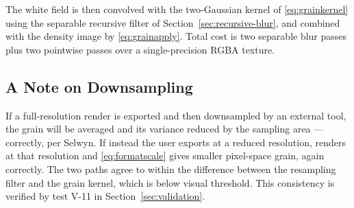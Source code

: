 The white field is then convolved with the two-Gaussian kernel of
\eqref{eq:grainkernel} using the separable recursive filter of
Section~\ref{sec:recursive-blur}, and combined with the density image by
\eqref{eq:grainapply}. Total cost is two separable blur passes plus two
pointwise passes over a single-precision RGBA texture.

\subsection{A Note on Downsampling}

If a full-resolution render is exported and then downsampled by an external
tool, the grain will be averaged and its variance reduced by the sampling
area --- correctly, per Selwyn. If instead the user exports at a reduced
resolution, \EM{} renders at that resolution and \eqref{eq:formatscale} gives
smaller pixel-space grain, again correctly. The two paths agree to within
the difference between the resampling filter and the grain kernel, which is
below visual threshold. This consistency is verified by test V-11 in
Section~\ref{sec:validation}.

